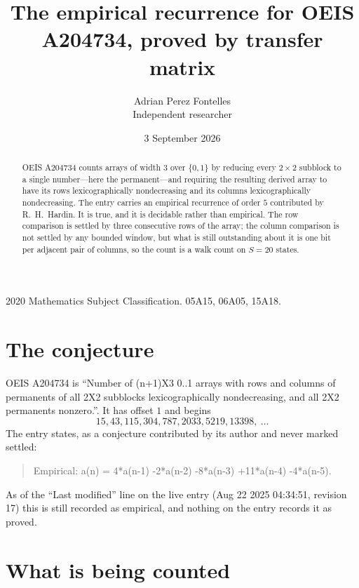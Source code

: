 \documentclass[11pt,a4paper]{article}
\title{The empirical recurrence for OEIS A204734, proved by transfer matrix}
\author{Adrian Perez Fontelles\\ \small Independent researcher}
\date{3 September 2026}
\theoremstyle{plain}
\theoremstyle{definition}
\begin{document}
\maketitle

\begin{abstract}
OEIS A204734 counts arrays of width $3$ over $\{0,1\}$ by reducing every $2\times2$ subblock to a
single number---here the permanent---and requiring the resulting derived array to have its rows
lexicographically nondecreasing and its columns lexicographically nondecreasing. The entry carries an
empirical recurrence of order $5$ contributed by R.~H.~Hardin. It is true, and it is
decidable rather than empirical. The row comparison is settled by three consecutive rows of the
array; the column comparison is not settled by any bounded window, but what is still outstanding
about it is one bit per adjacent pair of columns, so the count is a walk count on $S=20$
states.
\end{abstract}

\noindent\small 2020 Mathematics Subject Classification. 05A15, 06A05, 15A18.\normalsize

\section{The conjecture}

OEIS A204734 is ``Number of (n+1)X3 0..1 arrays with rows and columns of permanents of all 2X2 subblocks lexicographically nondecreasing, and all 2X2 permanents nonzero.''. It has offset $1$ and begins
\[
15, 43, 115, 304, 787, 2033, 5219, 13398,\ \dots
\]
The entry states, as a conjecture contributed by its author and never marked settled:
\begin{quote}
Empirical: a(n) = 4*a(n-1) -2*a(n-2) -8*a(n-3) +11*a(n-4) -4*a(n-5).
\end{quote}
As of the ``Last modified'' line on the live entry (Aug 22 2025 04:34:51, revision 17) this is still
recorded as empirical, and nothing on the entry records it as proved.

\section{What is being counted}
\end{document}
